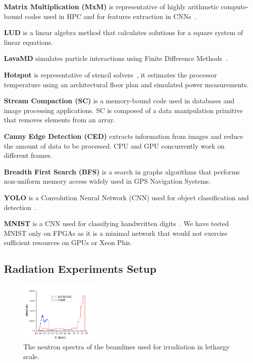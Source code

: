 \textbf{Matrix Multiplication (MxM)} is representative of highly arithmetic compute-bound codes used in HPC and for features extraction in CNNs~\cite{Dongarra2013}. 

\textbf{LUD} is a linear algebra method that calculates solutions for a square system of linear equations.%

\textbf{LavaMD} simulates particle interactions using Finite Difference Methods~\cite{lava2009}. %

\textbf{Hotspot} is representative of stencil solvers~\cite{lava2009}, it estimates the processor temperature using an architectural
floor plan and simulated power measurements. 

\textbf{Stream Compaction (SC)} is a memory-bound code used in databases and image processing applications. SC is composed of a data manipulation primitive that removes elements from an array.

\textbf{Canny Edge Detection (CED)} extracts information from images and reduce the amount of data to be processed. CPU and GPU concurrently work on different frames. %

\textbf{Breadth First Search (BFS)} is a search in graphs algorithms that performs non-uniform memory access widely used in GPS Navigation Systems. 

\textbf{YOLO} is a Convolution Neural Network (CNN) used for object classification and detection~\cite{yolo2015}. 

\textbf{MNIST} is a CNN used for classifying handwritten digits~\cite{deng2012}. We have tested MNIST only on FPGAs as it is a minimal network that would not exercise sufficient resources on GPUs or Xeon Phis.


\subsection{Radiation Experiments Setup}
\label{sub_beam_setup}

\begin{figure}[tb]
\centering
\includegraphics[width=0.35\textwidth]{./figs/rotax-chipir}
\caption{The neutron spectra of the beamlines used for irradiation in lethargy scale.}
\label{rotax_chipir}
\end{figure}

